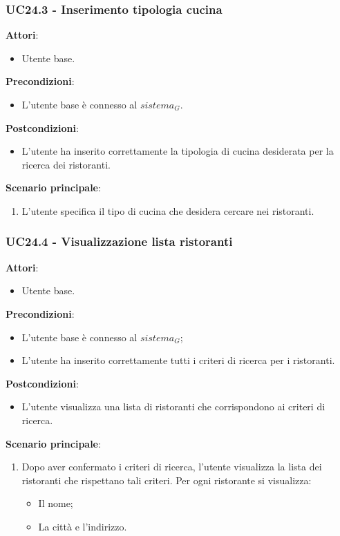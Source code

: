 \subsubsection{UC24.3 - Inserimento tipologia cucina
}\label{usecase:24_3}
\textbf{Attori}:
\begin{itemize}
    \item Utente base.
\end{itemize}
\textbf{Precondizioni}:
\begin{itemize}
    \item L'utente base è connesso al $\textit{sistema}_G$.
\end{itemize}
\textbf{Postcondizioni}:
\begin{itemize}
    \item L'utente ha inserito correttamente la tipologia di cucina desiderata per la ricerca dei ristoranti.
\end{itemize}
\textbf{Scenario principale}:
\begin{enumerate}
    \item L'utente specifica il tipo di cucina che desidera cercare nei ristoranti.
\end{enumerate}


\subsubsection{UC24.4 - Visualizzazione lista ristoranti
}\label{usecase:24_4}
\textbf{Attori}:
\begin{itemize}
    \item Utente base.
\end{itemize}
\textbf{Precondizioni}:
\begin{itemize}
    \item L'utente base è connesso al $\textit{sistema}_G$;
    \item L'utente ha inserito correttamente tutti i criteri di ricerca per i ristoranti.
\end{itemize}
\textbf{Postcondizioni}:
\begin{itemize}
    \item L'utente visualizza una lista di ristoranti che corrispondono ai criteri di ricerca.
\end{itemize}
\textbf{Scenario principale}:
\begin{enumerate}
    \item Dopo aver confermato i criteri di ricerca, l'utente visualizza la lista dei ristoranti che rispettano tali criteri. Per ogni ristorante si visualizza:
    \begin{itemize}
        \item Il nome;
        \item La città e l'indirizzo.
    \end{itemize}
\end{enumerate}



\newpage